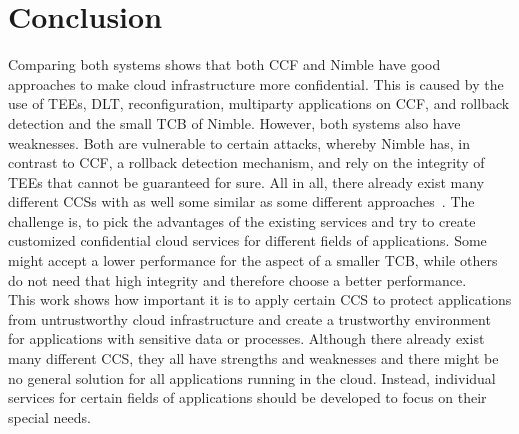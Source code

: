 \section{Conclusion}
Comparing both systems shows that both CCF and Nimble have good approaches to make cloud infrastructure more confidential. This is caused by the use of TEEs, DLT, reconfiguration, multiparty applications on CCF, and rollback detection and the small TCB of Nimble. However, both systems also have weaknesses. Both are vulnerable to certain attacks, whereby Nimble has, in contrast to CCF, a rollback detection mechanism, and rely on the integrity of TEEs that cannot be guaranteed for sure.
All in all, there already exist many different CCSs with as well some similar as some different approaches~\cite{rote, narrator, lcm}. The challenge is, to pick the advantages of the existing services and try to create customized confidential cloud services for different fields of applications. Some might accept a lower performance for the aspect of a smaller TCB, while others do not need that high integrity and therefore choose a better performance.\\
 This work shows how important it is to apply certain CCS to protect applications from untrustworthy cloud infrastructure and create a trustworthy environment for applications with sensitive data or processes. Although there already exist many different CCS, they all have strengths and weaknesses and there might be no general solution for all applications running in the cloud. Instead, individual services for certain fields of applications should be developed to focus on their special needs.